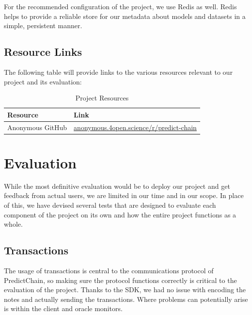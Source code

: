\documentclass{ledger}
\begin{document}
For the recommended configuration of the project, we use Redis as well.  Redis helps to provide a reliable store for our metadata about models and datasets in a simple, persistent manner.

\subsection{Resource Links}

The following table will provide links to the various resources relevant to our project and its evaluation:

\begin{table}[H]
    \caption{{Project Resources}}
    \label{tab:resources}
    \centering
    \begin{tabular}{|p{3cm}|p{11cm}|}
        \hline
        \textbf{Resource} & \textbf{Link}\\
        \hline
        Anonymous GitHub & \href{https://anonymous.4open.science/r/predict-chain}{anonymous.4open.science/r/predict-chain}\\
        \hline
    \end{tabular}
\end{table}

\section{Evaluation}

While the most definitive evaluation would be to deploy our project and get feedback from actual users, we are limited in our time and in our scope.  In place of this, we have devised several tests that are designed to evaluate each component of the project on its own and how the entire project functions as a whole.

\subsection{Transactions}

The usage of transactions is central to the communications protocol of PredictChain, so making sure the protocol functions correctly is critical to the evaluation of the project.  Thanks to the SDK, we had no issue with encoding the notes and actually sending the transactions.  Where problems can potentially arise is within the client and oracle monitors.
\end{document}
